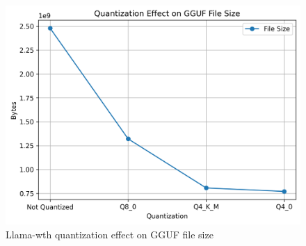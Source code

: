 \documentclass[licencjacka,en]{pracamgr}
\begin{document}
\begin{appendices}
\begin{figure}[h]
    \centering
    \includegraphics[width=0.8\linewidth]{bachelor_images/quant_comp/quantization_effect_on_gguf_file_size.png}
    \caption{Llama-wth quantization effect on GGUF file size}
    \label{fig:quantization_effect_on_gguf_file_size}
\end{figure}

\end{appendices}

\end{document}
